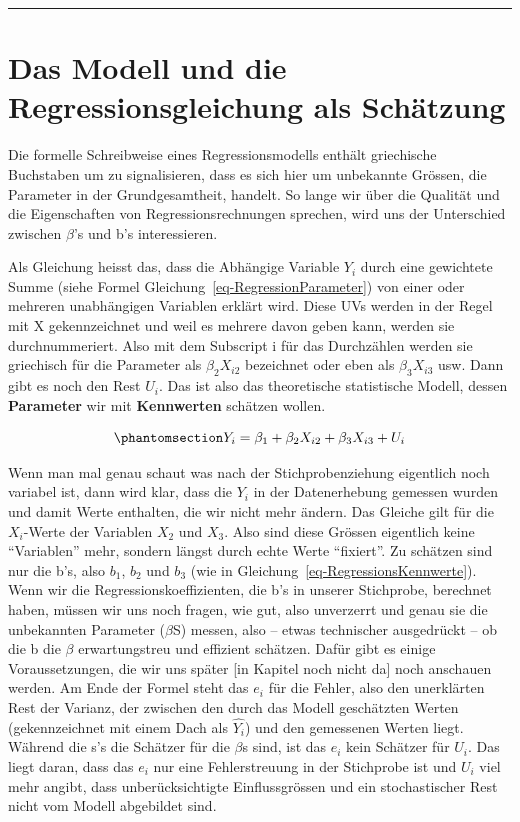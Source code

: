 \documentclass[
  10pt,
  letterpaper,
  a4paper, twoside]{scrreprt}
\begin{document}
\begin{center}\rule{0.5\linewidth}{0.5pt}\end{center}

\section{Das Modell und die Regressionsgleichung als
Schätzung}\label{das-modell-und-die-regressionsgleichung-als-schuxe4tzung}

Die formelle Schreibweise eines Regressionsmodells enthält griechische
Buchstaben um zu signalisieren, dass es sich hier um unbekannte Grössen,
die Parameter in der Grundgesamtheit, handelt. So lange wir über die
Qualität und die Eigenschaften von Regressionsrechnungen sprechen, wird
uns der Unterschied zwischen \(\beta\)'s und b's interessieren.

Als Gleichung heisst das, dass die Abhängige Variable \(Y_i\) durch eine
gewichtete Summe (siehe Formel Gleichung~\ref{eq-RegressionParameter})
von einer oder mehreren unabhängigen Variablen erklärt wird. Diese UVs
werden in der Regel mit X gekennzeichnet und weil es mehrere davon geben
kann, werden sie durchnummeriert. Also mit dem Subscript i für das
Durchzählen werden sie griechisch für die Parameter als
\(\beta_2X_{i2}\) bezeichnet oder eben als \(\beta_3X_{i3}\) usw. Dann
gibt es noch den Rest \(U_i\). Das ist also das theoretische
statistische Modell, dessen \textbf{Parameter} wir mit
\textbf{Kennwerten} schätzen wollen.

\begin{equation}\phantomsection\label{eq-RegressionParameter}{
   Y_i = \beta_1 + \beta_2X_{i2} + \beta_3X_{i3} + U_i
}\end{equation}

Wenn man mal genau schaut was nach der Stichprobenziehung eigentlich
noch variabel ist, dann wird klar, dass die \(Y_i\) in der Datenerhebung
gemessen wurden und damit Werte enthalten, die wir nicht mehr ändern.
Das Gleiche gilt für die \(X_i\)-Werte der Variablen \(X_2\) und
\(X_3\). Also sind diese Grössen eigentlich keine \enquote{Variablen}
mehr, sondern längst durch echte Werte \enquote{fixiert}. Zu schätzen
sind nur die b's, also \(b_1\), \(b_2\) und \(b_3\) (wie in
Gleichung~\ref{eq-RegressionsKennwerte}). Wenn wir die
Regressionskoeffizienten, die b's in unserer Stichprobe, berechnet
haben, müssen wir uns noch fragen, wie gut, also unverzerrt und genau
sie die unbekannten Parameter (\(\beta\)S) messen, also -- etwas
technischer ausgedrückt -- ob die b die \(\beta\) erwartungstreu und
effizient schätzen. Dafür gibt es einige Voraussetzungen, die wir uns
später {[}in Kapitel noch nicht da{]} noch anschauen werden. Am Ende der
Formel steht das \(e_i\) für die Fehler, also den unerklärten Rest der
Varianz, der zwischen den durch das Modell geschätzten Werten
(gekennzeichnet mit einem Dach als \(\hat{Y_i}\)) und den gemessenen
Werten liegt. Während die s's die Schätzer für die \(\beta\)s sind, ist
das \(e_i\) kein Schätzer für \(U_i\). Das liegt daran, dass das \(e_i\)
nur eine Fehlerstreuung in der Stichprobe ist und \(U_i\) viel mehr
angibt, dass unberücksichtigte Einflussgrössen und ein stochastischer
Rest nicht vom Modell abgebildet sind.
\end{document}
